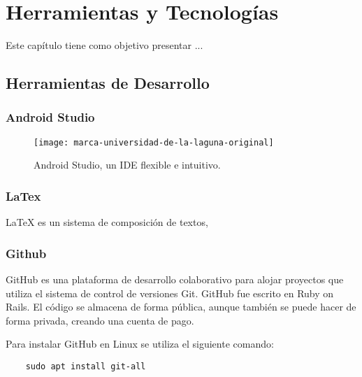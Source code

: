 %
 
\cleardoublepage
\chapter{Herramientas y Tecnologías} \label{chap:Tecnologias} 

Este capítulo tiene como objetivo presentar ...

\section{Herramientas de Desarrollo}

\subsection{Android Studio}

\begin{figure}[h]
    \centering
    \texttt{[image: marca-universidad-de-la-laguna-original]}
    \caption{Android Studio, un IDE flexible e intuitivo.}
    \label{fig:androidstudio}
\end{figure}

\subsection{LaTex}

LaTeX \cite{URL::LaTeX} es un sistema de composición de textos, 

\subsection{Github}

GitHub \cite{URL::Github} es una plataforma de desarrollo colaborativo para alojar proyectos que utiliza el sistema de control de versiones Git. 
GitHub fue escrito en Ruby on Rails. 
El código se almacena de forma pública, aunque también se puede hacer de forma privada, creando una cuenta de pago.

Para instalar GitHub en Linux se utiliza el siguiente comando:
\begin{lstlisting}
    sudo apt install git-all
\end{lstlisting}

